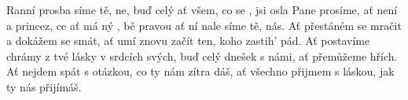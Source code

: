 \begin{TEXT}{Ranní prosba}
\SLOKA {}síme tě, ne, buď  celý  \NL
ať  všem, co se , jsi  osla 
\REFREN  Pane  prosíme,  \NL
ať  není  a  princez,\NL
{}ce ať má ný , \NL
{}bě pravou  ať ní nale \NL
{}síme tě,  nás.
\SLOKA Ať přestáném se mračit a dokážem se smát,\NL
ať umí znovu začít ten, koho zastih' pád.
\SLOKA Ať postavíme chrámy z tvé lásky v srdcích svých,\NL
buď celý dnešek s námi, ať přemůžeme hřích.
\SLOKA Ať nejdem spát s otázkou, co ty nám zítra dáš,\NL
ať všechno přijmem s láskou, jak ty nás přijímáš. \NL
\end{TEXT}
